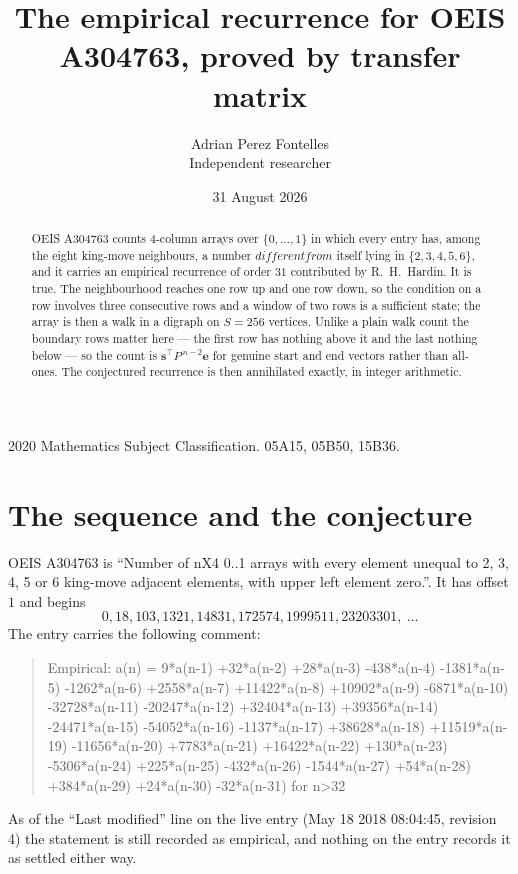 \documentclass[11pt,a4paper]{article}
\title{The empirical recurrence for OEIS A304763, proved by transfer matrix}
\author{Adrian Perez Fontelles\\ \small Independent researcher}
\date{31 August 2026}
\theoremstyle{plain}
\theoremstyle{definition}
\begin{document}
\maketitle

\begin{abstract}
OEIS A304763 counts $4$-column arrays over $\{0,\dots,1\}$ in which every entry has,
among the eight king-move neighbours, a number $different from$ itself lying in $\{2,3,4,5,6\}$, and it carries an empirical
recurrence of order $31$ contributed by R.~H.~Hardin. It is true. The neighbourhood
reaches one row up and one row down, so the condition on a row involves three consecutive
rows and a window of two rows is a sufficient state; the array is then a walk in a digraph
on $S=256$ vertices. Unlike a plain walk count the boundary rows matter here --- the first
row has nothing above it and the last nothing below --- so the count is
$\mathbf{s}^{\!\top}P^{\,n-2}\mathbf{e}$ for genuine start and end vectors rather than
all-ones. The conjectured recurrence is then annihilated exactly, in integer arithmetic.
\end{abstract}

\noindent\small 2020 Mathematics Subject Classification. 05A15, 05B50, 15B36.\normalsize

\section{The sequence and the conjecture}

OEIS A304763 is ``Number of nX4 0..1 arrays with every element unequal to 2, 3, 4, 5 or 6 king-move adjacent elements, with upper left element zero.''. It has offset
$1$ and begins
\[
0, 18, 103, 1321, 14831, 172574, 1999511, 23203301,\ \dots
\]
The entry carries the following comment:
\begin{quote}\small
Empirical: a(n) = 9*a(n-1) +32*a(n-2) +28*a(n-3) -438*a(n-4) -1381*a(n-5) -1262*a(n-6) +2558*a(n-7) +11422*a(n-8) +10902*a(n-9) -6871*a(n-10) -32728*a(n-11) -20247*a(n-12) +32404*a(n-13) +39356*a(n-14) -24471*a(n-15) -54052*a(n-16) -1137*a(n-17) +38628*a(n-18) +11519*a(n-19) -11656*a(n-20) +7783*a(n-21) +16422*a(n-22) +130*a(n-23) -5306*a(n-24) +225*a(n-25) -432*a(n-26) -1544*a(n-27) +54*a(n-28) +384*a(n-29) +24*a(n-30) -32*a(n-31) for n>32
\end{quote}
As of the ``Last modified'' line on the live entry (May 18 2018 08:04:45, revision
4) the statement is still recorded as empirical, and nothing on the entry
records it as settled either way.
\end{document}
